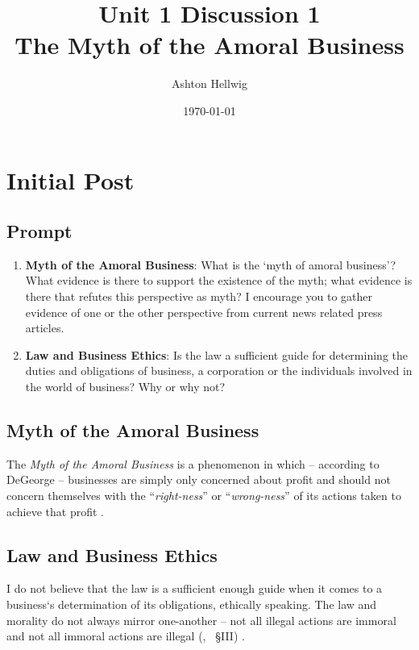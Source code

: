 \documentclass[12pt]{article}
\title{%
    Unit 1 Discussion 1\\%
    \large{The Myth of the Amoral Business}
  }
\author{Ashton Hellwig}
\date{\today}
\newcommand{\CiteSection}[2]{%
    (\cite{#1}, ~\S {#2})\hspace{-4pt}
  }
\begin{document}
  \maketitle
  
  \section{Initial Post}
    \begin{mdframed}
      \vspace{-10pt}
      \subsection*{Prompt}
      \begin{enumerate}
        \item \textbf{Myth of the Amoral Business}: What is the ‘myth of amoral business’? What evidence is
        there to support the existence of the myth; what evidence is there that refutes this perspective as
          myth? I encourage you to gather evidence of one or the other perspective from current news related press articles.
        \item \textbf{Law and Business Ethics}: Is the law a sufficient guide for determining the duties and
          obligations of business, a corporation or the individuals involved in the world of business? Why or
          why not?
      \end{enumerate}
    \end{mdframed}
  
    \subsection{Myth of the Amoral Business}
      The \textit{Myth of the Amoral Business} is a phenomenon in which -- according to DeGeorge --
        businesses are simply only concerned about profit and should not concern themselves with the
        ``\textit{right-ness}'' or ``\textit{wrong-ness}'' of its actions taken to achieve that
        profit \autocite{textbook}.

    \subsection{Law and Business Ethics}
      I do not believe that the law is a sufficient enough guide when it comes to a business`s
        determination of its obligations, ethically speaking. The law and morality do not
        always mirror one-another -- not all illegal actions are immoral and not all immoral
        actions are illegal \CiteSection{hellmers_2020}{III}.
\end{document}
